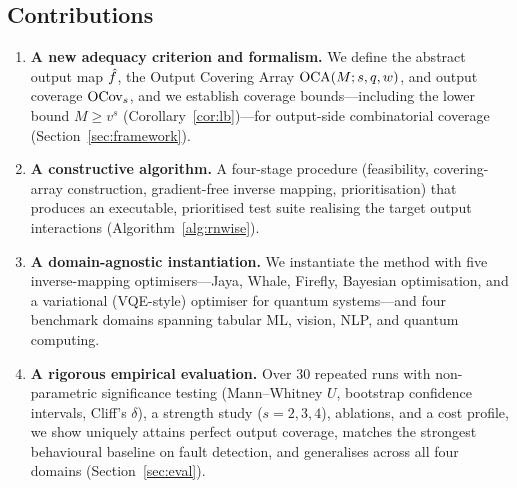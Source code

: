 \subsection{Contributions}
\begin{enumerate}
\item \textbf{A new adequacy criterion and formalism.} We define the abstract
output map $\hat{f}$, the Output Covering Array $\mathrm{OCA}(M;s,q,w)$, and output
coverage $\mathrm{OCov}_s$, and we establish coverage bounds---including the lower bound
$M \ge v^{s}$ (Corollary~\ref{cor:lb})---for output-side combinatorial coverage
(Section~\ref{sec:framework}).
\item \textbf{A constructive algorithm.} A four-stage procedure
(feasibility, covering-array construction, gradient-free inverse mapping,
prioritisation) that produces an executable, prioritised test suite realising the
target output interactions (Algorithm~\ref{alg:rnwise}).
\item \textbf{A domain-agnostic instantiation.} We instantiate the method with
five inverse-mapping optimisers---Jaya, Whale, Firefly, Bayesian optimisation,
and a variational (VQE-style) optimiser for quantum systems---and four benchmark
domains spanning tabular ML, vision, NLP, and quantum computing.
\item \textbf{A rigorous empirical evaluation.} Over 30 repeated runs with
non-parametric significance testing (Mann--Whitney $U$, bootstrap confidence
intervals, Cliff's $\delta$), a strength study ($s=2,3,4$), ablations, and a cost
profile, we show \rnwise{} uniquely attains perfect output coverage, matches the
strongest behavioural baseline on fault detection, and generalises across all
four domains (Section~\ref{sec:eval}).
\end{enumerate}
